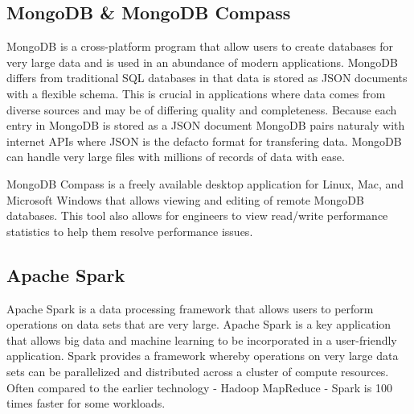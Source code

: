 \documentclass[conference,twoside]{IEEEtran}
\begin{document}
\subsection{MongoDB \& MongoDB Compass}
MongoDB is a cross-platform program that allow users to create databases for very large data and is used in an abundance of modern applications. MongoDB differs from traditional SQL databases in that data is stored as JSON documents with a flexible schema. This is crucial in applications where data comes from diverse sources and may be of differing quality and completeness. Because each entry in MongoDB is stored as a JSON document MongoDB pairs naturaly with internet APIs where JSON is the defacto format for transfering data. MongoDB can handle very large files with millions of records of data with ease\cite{mongodb}.

MongoDB Compass is a freely available desktop application for Linux, Mac, and Microsoft Windows that allows viewing and editing of remote MongoDB databases. This tool also allows for engineers to view read/write performance statistics to help them resolve performance issues\cite{mongodbcompass}.

\subsection{Apache Spark}
Apache Spark is a data processing framework that allows users to perform operations on data sets that are very large. Apache Spark is a key application that allows big data and machine learning to be incorporated in a user-friendly application. Spark provides a framework whereby operations on very large data sets can be parallelized and distributed across a cluster of compute resources. Often compared to the earlier technology - Hadoop MapReduce - Spark is 100 times faster for some workloads.
\end{document}
